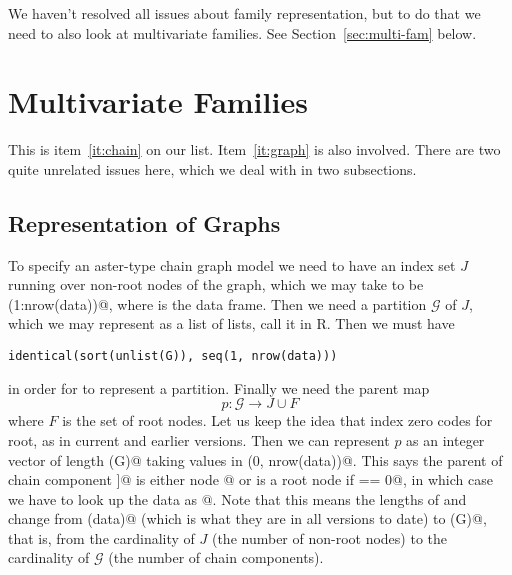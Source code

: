 \documentclass[11pt]{article}
\begin{document}
We haven't resolved all issues about family representation,
but to do that we need to also look at multivariate families.
See Section~\ref{sec:multi-fam} below.

\section{Multivariate Families} \label{sec:chain}

This is item~\ref{it:chain} on our list.
Item~\ref{it:graph} is also involved.
There are two quite unrelated issues here, which we deal
with in two subsections.

\subsection{Representation of Graphs}

To specify an aster-type chain graph model we need to have an
index set $J$ running over non-root nodes of the graph, which
we may take to be \verb@seq(1:nrow(data))@, where \verb@data@
is the data frame.  Then we need a partition $\mathcal{G}$ of $J$,
which we may represent as a list of lists, call it \verb@G@ in R.
Then we must have
\begin{verbatim}
identical(sort(unlist(G)), seq(1, nrow(data)))
\end{verbatim}
in order for \verb@G@ to represent a partition.
Finally we need the parent map
$$
   p : \mathcal{G} \to J \cup F
$$
where $F$ is the set of root nodes.
Let us keep the idea that index zero codes for root,
as in current and earlier versions.  Then we
can represent $p$ as an integer vector \verb@pred@ of length \verb@length(G)@ 
taking values in \verb@seq(0, nrow(data))@.
This says the parent of
chain component \verb@G[[i]]@ is either node \verb@pred[i]@
or is a root node if \verb@pred[i] == 0@, in which case we have to look
up the data as \verb@root[i]@.  Note that this means the lengths of
\verb@pred@ and \verb@root@ change from \verb@nrow(data)@ (which is what
they are in all versions to date) to \verb@length(G)@,
that is, from the cardinality of $J$ (the number of non-root nodes)
to the cardinality of $\mathcal{G}$ (the number of chain components).
\end{document}
